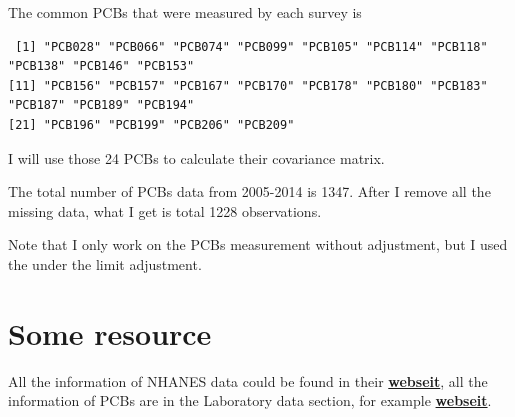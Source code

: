 \documentclass[]{article}
\begin{document}
The common PCBs that were measured by each survey is

\begin{verbatim}
 [1] "PCB028" "PCB066" "PCB074" "PCB099" "PCB105" "PCB114" "PCB118" "PCB138" "PCB146" "PCB153"
[11] "PCB156" "PCB157" "PCB167" "PCB170" "PCB178" "PCB180" "PCB183" "PCB187" "PCB189" "PCB194"
[21] "PCB196" "PCB199" "PCB206" "PCB209"
\end{verbatim}

I will use those 24 PCBs to calculate their covariance matrix.

The total number of PCBs data from 2005-2014 is 1347. After I remove all
the missing data, what I get is total 1228 observations.

Note that I only work on the PCBs measurement without adjustment, but I
used the under the limit adjustment.

\section{Some resource}\label{some-resource}

All the information of NHANES data could be found in their
\href{https://wwwn.cdc.gov/nchs/nhanes/}{\textbf{\textbf{webseit}}}, all
the information of PCBs are in the Laboratory data section, for example
\href{https://wwwn.cdc.gov/Nchs/Nhanes/2001-2002/L28POC_B.htm}{\textbf{\textbf{webseit}}}.
\end{document}
